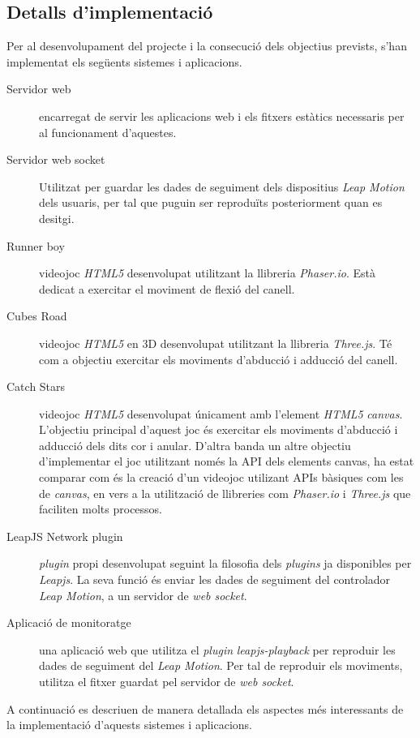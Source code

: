 \documentclass[12pt,a4paper,catalan]{article}
\begin{document}
	\subsection{Detalls d'implementació}
	Per al desenvolupament del projecte i la consecució dels objectius prevists, s'han implementat els següents sistemes i aplicacions.
	\begin{description}
		\item[Servidor web] encarregat de servir les aplicacions web i els fitxers estàtics necessaris per al funcionament d'aquestes.
		\item[Servidor web socket] Utilitzat per guardar les dades de seguiment dels dispositius \textit{Leap Motion} dels usuaris, per tal que puguin ser reproduïts posteriorment quan es desitgi.
		\item[Runner boy] videojoc \textit{HTML5} desenvolupat utilitzant la llibreria \textit{Phaser.io}. Està dedicat a exercitar el moviment de flexió del canell.
		\item[Cubes Road] videojoc \textit{HTML5} en 3D desenvolupat utilitzant la llibreria \textit{Three.js}. Té com a objectiu exercitar els moviments d'abducció i adducció del canell.
		\item[Catch Stars] videojoc \textit{HTML5} desenvolupat únicament amb l'element \textit{HTML5} \textit{canvas}. L'objectiu principal d'aquest joc és exercitar els moviments d'abducció i adducció dels dits cor i anular. D'altra banda un altre objectiu d'implementar el joc utilitzant només la API dels elements canvas, ha estat comparar com és la creació d'un videojoc utilizant APIs bàsiques com les de \textit{canvas}, en vers a la utilització de llibreries com \textit{Phaser.io} i \textit{Three.js} que faciliten molts processos.
		\item[LeapJS Network plugin] \textit{plugin} propi desenvolupat seguint la filosofia dels \textit{plugins} ja disponibles per \textit{Leapjs}. La seva funció és enviar les dades de seguiment del controlador \textit{Leap Motion}, a un servidor de \textit{web socket}.
		\item[Aplicació de monitoratge] una aplicació web que utilitza el \textit{plugin} \textit{leapjs-playback} per reproduir les dades de seguiment del \textit{Leap Motion}. Per tal de reproduir els moviments, utilitza el fitxer guardat pel servidor de \textit{web socket}.
	\end{description}
	A continuació es descriuen de manera detallada els aspectes més interessants de la implementació d'aquests sistemes i aplicacions.
\end{document}
